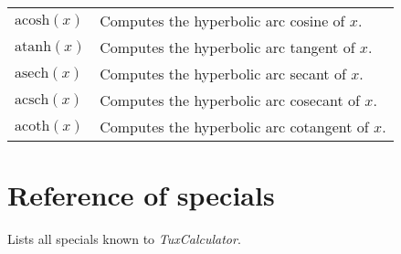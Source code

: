 \documentclass[10pt]{article}
\begin{document}
\begin{longtable}{p{}p{}}
        $ \mathrm{acosh}(x) $                      & Computes the hyperbolic arc cosine of $ x $. \\
        $ \mathrm{atanh}(x) $                      & Computes the hyperbolic arc tangent of $ x $. \\
        $ \mathrm{asech}(x) $                      & Computes the hyperbolic arc secant of $ x $. \\
        $ \mathrm{acsch}(x) $                      & Computes the hyperbolic arc cosecant of $ x $. \\
        $ \mathrm{acoth}(x) $                      & Computes the hyperbolic arc cotangent of $ x $. \\
    \end{longtable}
    
    \section{Reference of specials}\label{sec:reference-special}
    Lists all specials known to \textit{TuxCalculator}.
\end{document}

